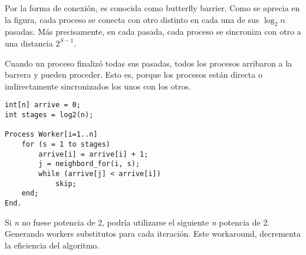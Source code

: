 \documentclass[a4paper, 10pt]{report}
\begin{document}
Por la forma de conexión, es conocida como butterfly barrier. Como se aprecia en la figura, cada proceso se conecta con otro distinto en cada una de sus $\log_2n$ pasadas. Más precisamente, en cada pasada, cada proceso se sincroniza con otro a una distancia $2^{S-1}$.

Cuando un proceso finalizó todas sus pasadas, todos los procesos arribaron a la barrera y pueden proceder. Esto es, porque los procesos están directa o indirectamente sincronizados los unos con los otros.

\noindent
\begin{minipage}{.4\textwidth}
\begin{lstlisting}
int[n] arrive = 0;
int stages = log2(n);

Process Worker[i=1..n]
	for (s = 1 to stages)
		arrive[i] = arrive[i] + 1;
		j = neighbord_for(i, s);
		while (arrive[j] < arrive[i]) 
			skip;
	end;
End.
\end{lstlisting}
\end{minipage}
\noindent
\begin{minipage}{.6\textwidth}
\end{minipage}%





Si \emph{n} no fuese potencia de 2, podría utilizarse el siguiente \emph{n} potencia de 2. Generando workers substitutos para cada iteración. Este workaround, decrementa la eficiencia del algoritmo.
\end{document}
